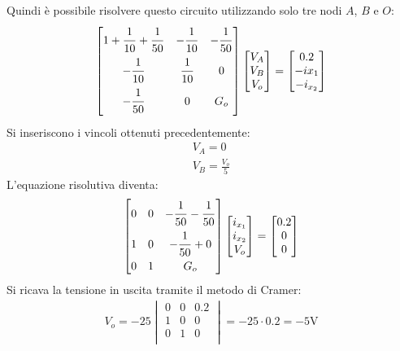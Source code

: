 \documentclass{article}
\begin{document}
Quindi è possibile risolvere questo circuito utilizzando solo tre nodi $A$, $B$ e $O$:
\begin{gather*}
    \begin{bmatrix}
        1+\displaystyle\frac{\strut1}{\strut 10}+\frac{\strut 1}{\strut 50}&-\displaystyle\frac{\strut 1}{\strut 10}&-\displaystyle\frac{\strut 1}{\strut 50}\\
        -\displaystyle\frac{\strut 1}{\strut 10}&\displaystyle\frac{\strut1}{\strut10}&0\\
        -\displaystyle\frac{\strut 1}{\strut 50}&0&G_o\\
    \end{bmatrix}\begin{bmatrix}
        V_A\\V_B\\V_o
    \end{bmatrix}=\begin{bmatrix}
        0.2\\-i{x_1}\\-i_{x_2}
    \end{bmatrix}
\end{gather*}
Si inseriscono i vincoli ottenuti precedentemente:
\begin{gather*}
    V_A=0\\
    V_B=\displaystyle\frac{V_o}{5}
\end{gather*}
L'equazione risolutiva diventa:
\begin{gather*}
    \begin{bmatrix}
        0&0&-\displaystyle\frac{\strut 1}{\strut 50}-\frac{\strut 1}{\strut 50}\\
        1&0&-\displaystyle\frac{\strut 1}{\strut 50}+0\\
        0&1&G_o\\
    \end{bmatrix}\begin{bmatrix}
        i_{x_1}\\i_{x_2}\\V_o
    \end{bmatrix}=\begin{bmatrix}
        0.2\\0\\0
    \end{bmatrix}
\end{gather*}
Si ricava la tensione in uscita tramite il metodo di Cramer:
\begin{gather}
    V_o=-25\begin{vmatrix}
        0&0&0.2\\
        1&0&0\\
        0&1&0\\
    \end{vmatrix}=-25\cdot0.2=-5\mathrm{V}
\end{gather}
\end{document}
